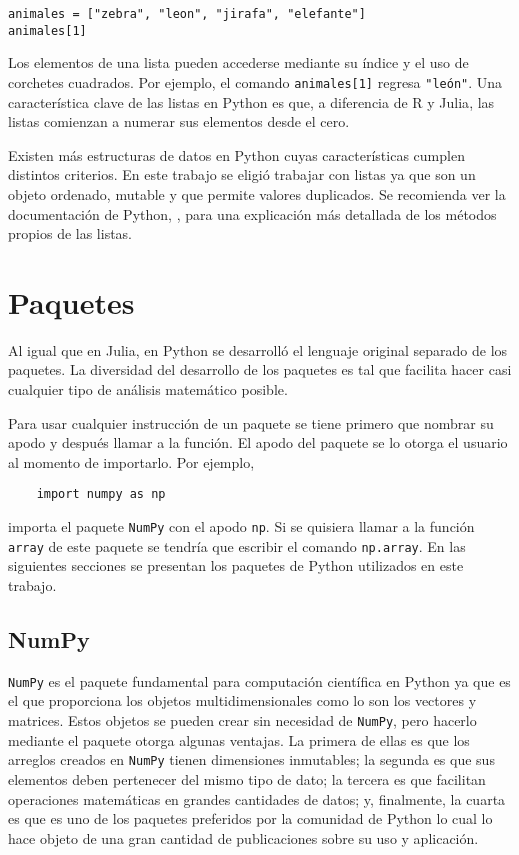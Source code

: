 \begin{verbatim}
animales = ["zebra", "leon", "jirafa", "elefante"]
animales[1]
\end{verbatim}

Los elementos de una lista pueden accederse mediante su índice y el uso de corchetes cuadrados. Por ejemplo, el comando \texttt{animales[1]} regresa \texttt{"león"}. Una característica clave de las listas en \textsf{Python} es que, a diferencia de \textsf{R} y \textsf{Julia}, las listas comienzan a numerar sus elementos desde el cero. 

Existen más estructuras de datos en \textsf{Python} cuyas características cumplen distintos criterios. En este trabajo se eligió trabajar con listas ya que son un objeto ordenado, mutable y que permite valores duplicados. Se recomienda ver la documentación de \textsf{Python}, \cite{doc_python}, para una explicación más detallada de los métodos propios de las listas. 

\section{Paquetes}
Al igual que en \textsf{Julia}, en \textsf{Python} se desarrolló el lenguaje original separado de los paquetes. La diversidad del desarrollo de los paquetes es tal que facilita hacer casi cualquier tipo de análisis matemático posible. 

Para usar cualquier instrucción de un paquete se tiene primero que nombrar su apodo y después llamar a la función. El apodo del paquete se lo otorga el usuario al momento de importarlo. Por ejemplo, 
\begin{verbatim}
	import numpy as np
\end{verbatim}

\noindent importa el paquete \texttt{NumPy} con el apodo \texttt{np}. Si se quisiera llamar a la función \texttt{array} de este paquete se tendría que escribir el comando \texttt{np.array}. En las siguientes secciones se presentan los paquetes de \textsf{Python} utilizados en este trabajo. 

\subsection{NumPy} \label{seccion_numpy}
\texttt{NumPy} \citep{software_numpy} es el paquete fundamental para computación científica en \textsf{Python} ya que es el que proporciona los objetos multidimensionales como lo son los vectores y matrices. Estos objetos se pueden crear sin necesidad de \texttt{NumPy}, pero hacerlo mediante el paquete otorga algunas ventajas. La primera de ellas es que los arreglos creados en \texttt{NumPy} tienen dimensiones inmutables; la segunda es que sus elementos deben pertenecer del mismo tipo de dato; la tercera es que facilitan operaciones matemáticas en grandes cantidades de datos; y, finalmente, la cuarta es que es uno de los paquetes preferidos por la comunidad de \textsf{Python} lo cual lo hace objeto de una gran cantidad de publicaciones sobre su uso y aplicación. 

